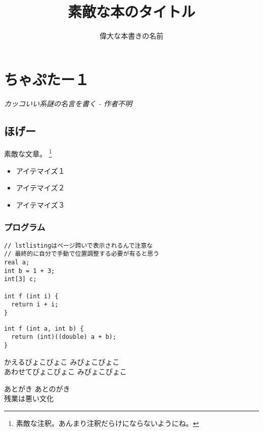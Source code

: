 \documentclass[9pt,b5paper,dvipdfmx,openany]{jsbook}
\title{素敵な本のタイトル}
\author{偉大な本書きの名前}
\begin{document}
\maketitle
\tableofcontents

\chapter{ちゃぷたー１}
\begin{flushright}
  \it カッコいい系謎の名言を書く - 作者不明 \\
\end{flushright}

\section{ほげー}

素敵な文章。
\footnote{素敵な注釈。あんまり注釈だらけにならないようにね。}

\begin{itemize}
\item アイテマイズ１
\item アイテマイズ２
\item アイテマイズ３
\end{itemize}

\subsection{プログラム}
\begin{lstlisting}
// lstlistingはページ跨いで表示されるんで注意な
// 最終的に自分で手動で位置調整する必要が有ると思う
real a;
int b = 1 + 3;
int[3] c;

int f (int i) {
  return i + i;
}
\end{lstlisting}

\begin{minipage}[t]{0.5\linewidth}
\begin{lstlisting}[caption=プログラム]
int f (int a, int b) {
  return (int)((double) a + b);
}
\end{lstlisting}
\end{minipage}
\begin{minipage}[t]{0.5\linewidth}
  \centering
  かえるぴょこぴょこ みぴょこぴょこ \\
  あわせてぴょこぴょこ みぴょこぴょこ
\end{minipage}

\begin{itembox}[l]{あとがき}
  あとのがき \\
  残業は悪い文化
\end{itembox}
\end{document}
